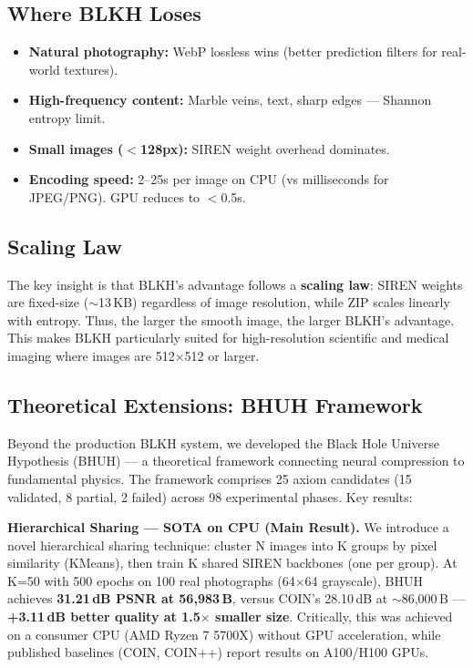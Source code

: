 \documentclass[11pt,a4paper]{article}
\begin{document}
\subsection{Where BLKH Loses}

\begin{itemize}[leftmargin=*]
    \item \textbf{Natural photography:} WebP lossless wins (better prediction filters for real-world textures).
    \item \textbf{High-frequency content:} Marble veins, text, sharp edges --- Shannon entropy limit.
    \item \textbf{Small images ($<$128px):} SIREN weight overhead dominates.
    \item \textbf{Encoding speed:} 2--25s per image on CPU (vs milliseconds for JPEG/PNG). GPU reduces to $<$0.5s.
\end{itemize}

\subsection{Scaling Law}

The key insight is that BLKH's advantage follows a \textbf{scaling law}: SIREN weights are fixed-size ($\sim$13\,KB) regardless of image resolution, while ZIP scales linearly with entropy. Thus, the larger the smooth image, the larger BLKH's advantage. This makes BLKH particularly suited for high-resolution scientific and medical imaging where images are 512$\times$512 or larger.

\subsection{Theoretical Extensions: BHUH Framework}

Beyond the production BLKH system, we developed the Black Hole Universe Hypothesis (BHUH) — a theoretical framework connecting neural compression to fundamental physics. The framework comprises 25 axiom candidates (15 validated, 8 partial, 2 failed) across 98 experimental phases. Key results:

\textbf{Hierarchical Sharing — SOTA on CPU (Main Result).} We introduce a novel hierarchical sharing technique: cluster N images into K groups by pixel similarity (KMeans), then train K shared SIREN backbones (one per group). At K=50 with 500 epochs on 100 real photographs (64$\times$64 grayscale), BHUH achieves \textbf{31.21$\,$dB PSNR at 56,983$\,$B}, versus COIN's 28.10$\,$dB at $\sim$86,000$\,$B — \textbf{+3.11$\,$dB better quality at 1.5$\times$ smaller size}. Critically, this was achieved on a consumer CPU (AMD Ryzen 7 5700X) without GPU acceleration, while published baselines (COIN, COIN++) report results on A100/H100 GPUs.
\end{document}
